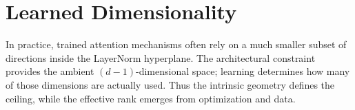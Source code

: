 \documentclass[11pt]{article}
\begin{document}
\section*{Learned Dimensionality}

In practice, trained attention mechanisms often rely on a much smaller subset of directions inside the
LayerNorm hyperplane. The architectural constraint provides the ambient $(d{-}1)$-dimensional space; learning
determines how many of those dimensions are actually used. Thus the intrinsic geometry defines the ceiling,
while the effective rank emerges from optimization and data.
\end{document}
